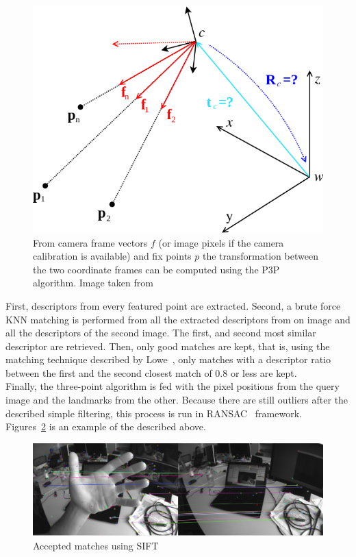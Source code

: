 \begin{figure}[htpb]
  \centering
  \includegraphics[width=0.6\linewidth]{img/absolute_central.png}
  \caption{From camera frame vectors $f$ (or image pixels if the camera calibration is available) and fix points $p$ the transformation between the two coordinate frames can be computed using the P3P algorithm. Image taken from \cite{kneipopengv}}
  \label{fig:img/absolute_centra}
\end{figure}

First, descriptors from every featured point are extracted. Second, a brute force KNN matching is performed from all the extracted descriptors from on image and all the descriptors of the second image. The first, and second most similar descriptor are retrieved. Then, only good matches are kept, that is, using the matching technique described by Lowe~\cite{lowe2004distinctive}, only matches with a descriptor ratio between the first and the second closest match of 0.8 or less are kept.\\

Finally, the three-point algorithm is fed with the pixel positions from the query image and the landmarks from the other. Because there are still outliers after the described simple filtering, this process is run in RANSAC~\cite{fischler1981random} framework. \\


Figures~\ref{fig:3pt_matches} is an example of the described above.\\

\begin{figure}[htpb]
  \centering
  \includegraphics[width=1.0\linewidth]{img/3pt_matches_1.png}
  \caption{Accepted matches using SIFT}
  \label{fig:3pt_matches}
\end{figure}


